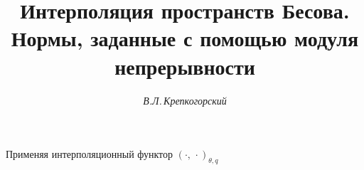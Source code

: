 




%


\newcommand{\tts}[1]{}







\setcounter{page}{76}















\author{\it В.Л.\,Крепкогорский}




\title{Интерполяция пространств Бесова.\\


Нормы, заданные с помощью модуля непрерывности}





\date{}




\pagestyle{plain} %







\maketitle


\label{begin}





Применяя интерполяционный функтор $(\cdot,\,\cdot )_{\theta,q}$


